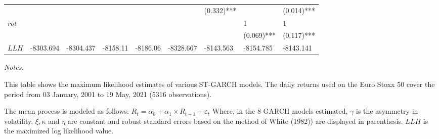 \documentclass[a4paper, nobind]{templates/ociamthesis}
\begin{document}
\begin{landscape}
\begin{table}
\begin{threeparttable}
{\begin{tabular}[t]{lllllllll}
 &  &  &  &  &  & (0.332)*** &  & (0.014)***\\
$rot$ &  &  &  &  &  &  & 1 & 1\\
 &  &  &  &  &  &  & (0.069)*** & (0.117)***\\
\addlinespace
$LLH$ & -8303.694 & -8304.437 & -8158.11 & -8186.06 & -8328.667 & -8143.563 & -8154.785 & -8143.141\\
\bottomrule
\end{tabular}}
\begin{tablenotes}
\item \textit{Notes:} 
\item This table shows the maximum likelihood estimates of various ST-GARCH models. The daily returns used on the Euro Stoxx 50 cover the period from 03 January, 2001 to 19 May, 2021 (5316 observations).
\item The mean process is modeled as follows: $R_t= \alpha_0+ \alpha_1 \times R_{t-1}+ \varepsilon_t$ Where, in the 8 GARCH models estimated, $\gamma$ is the asymmetry in volatility, $\xi, \kappa$ and $\eta$ are constant and robust standard errors based on the method of White (1982)) are displayed in parenthesis. $LLH$ is the maximized log likelihood value.
\end{tablenotes}
\end{threeparttable}
\end{table}
\end{landscape}

\clearpage
\newpage
\end{document}
